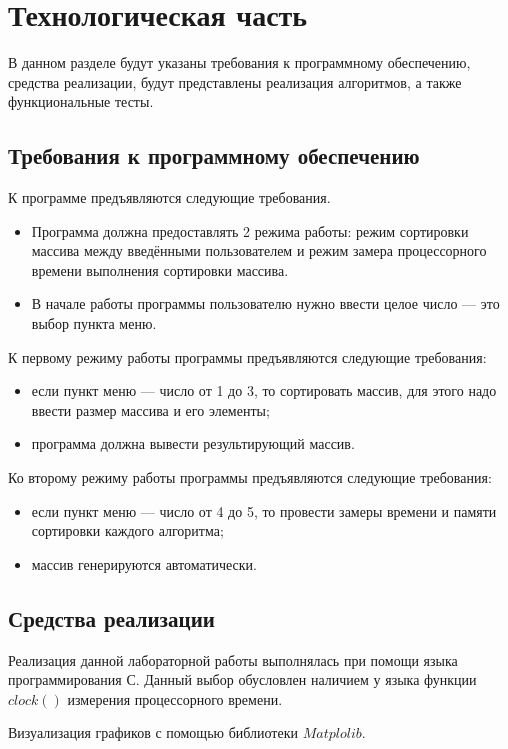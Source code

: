 \chapter{Технологическая часть}

В данном разделе будут указаны требования к программному обеспечению, средства реализации, будут представлены реализация алгоритмов, а также функциональные тесты.

\section{Требования к программному обеспечению}
К программе предъявляются следующие требования.
\begin{itemize}
	\item Программа должна предоставлять 2 режима работы: режим сортировки массива между введёнными пользователем и режим замера процессорного времени выполнения сортировки массива.
	\item В начале работы программы пользователю нужно ввести целое число --- это выбор пункта меню.
\end{itemize}

К первому режиму работы программы предъявляются следующие требования:
\begin{itemize}
	\item если пункт меню --- число от 1 до 3, то сортировать массив, для этого надо ввести размер массива и его элементы;
	\item программа должна вывести результирующий массив.
\end{itemize}

Ко второму режиму работы программы предъявляются следующие требования:
\begin{itemize}
	\item если пункт меню --- число от 4 до 5, то провести замеры времени и памяти сортировки каждого алгоритма;
	\item массив генерируются автоматически.
\end{itemize}

\section{Средства реализации}

Реализация данной лабораторной работы выполнялась при помощи языка программирования С. Данный выбор обусловлен наличием у языка функции $clock()$ измерения процессорного времени.

Визуализация графиков с помощью библиотеки $Matplolib$.
